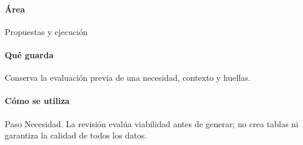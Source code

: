 \paragraph{Área} Propuestas y ejecución

\paragraph{Qué guarda} Conserva la evaluación previa de una necesidad, contexto y huellas.

\paragraph{Cómo se utiliza} Paso Necesidad. La revisión evalúa viabilidad antes de generar; no crea tablas ni garantiza la calidad de todos los datos.

